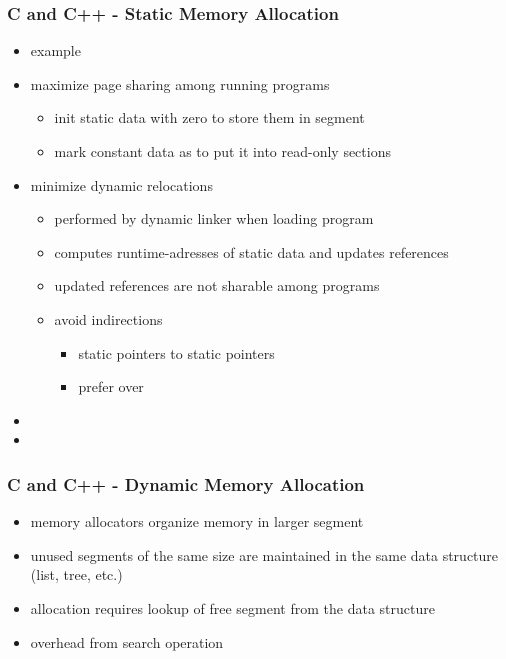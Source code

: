 \begin{frame}
 \frametitle{C and C++ - Static Memory Allocation}
 \begin{itemize}
  \item example 
  \item maximize page sharing among running programs
  \begin{itemize}
   \item init static data with zero to store them in  segment
   \item mark constant data as  to put it into read-only sections
  \end{itemize}
  \item minimize dynamic relocations
  \begin{itemize}
   \item performed by dynamic linker when loading program
   \item computes runtime-adresses of static data and updates references
   \item updated references are not sharable among programs
   \item avoid indirections
    \begin{itemize}
     \item static pointers to static pointers
     \item prefer  over 
    \end{itemize}
  \end{itemize}
  \item {}
  \item {}
 \end{itemize}
\end{frame}

\begin{frame}
 \frametitle{C and C++ - Dynamic Memory Allocation}
 \begin{itemize}
  \item memory allocators organize memory in larger segment
  \item unused segments of the same size are maintained in the same data structure (list, tree, etc.)
  \item allocation requires lookup of free segment from the data structure
  \item overhead from search operation
 \end{itemize}
\end{frame}

